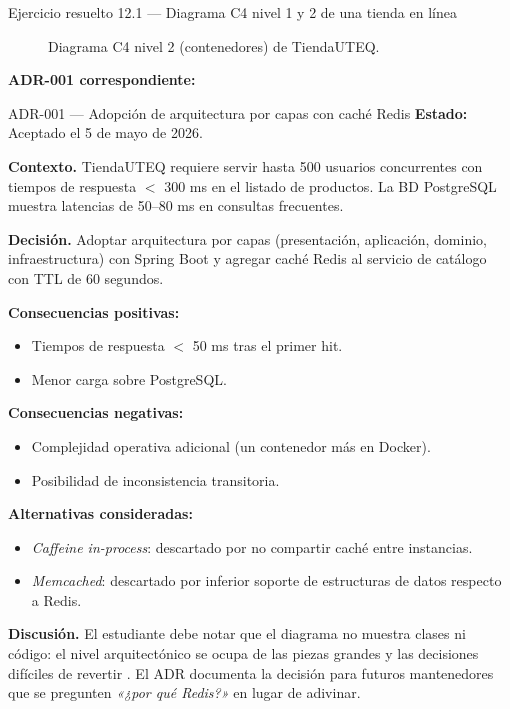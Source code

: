 \begin{cajaejemplo}{Ejercicio resuelto 12.1 --- Diagrama C4 nivel 1 y 2 de una tienda en línea}
\begin{figure}[H]
\caption{Diagrama C4 nivel 2 (contenedores) de TiendaUTEQ.}
\end{figure}

\textbf{ADR-001 correspondiente:}

\begin{cajaadr}{ADR-001 --- Adopción de arquitectura por capas con caché Redis}
\textbf{Estado:} Aceptado el 5 de mayo de 2026.

\textbf{Contexto.} TiendaUTEQ requiere servir hasta 500
usuarios concurrentes con tiempos de respuesta $<$ 300 ms en el
listado de productos. La BD PostgreSQL muestra latencias de 50--80 ms
en consultas frecuentes.

\textbf{Decisión.} Adoptar arquitectura por capas (presentación,
aplicación, dominio, infraestructura) con Spring Boot y agregar caché
Redis al servicio de catálogo con TTL de 60 segundos.

\textbf{Consecuencias positivas:}
\begin{itemize}
\item Tiempos de respuesta $<$ 50 ms tras el primer hit.
\item Menor carga sobre PostgreSQL.
\end{itemize}

\textbf{Consecuencias negativas:}
\begin{itemize}
\item Complejidad operativa adicional (un contenedor más en Docker).
\item Posibilidad de inconsistencia transitoria.
\end{itemize}

\textbf{Alternativas consideradas:}
\begin{itemize}
\item \emph{Caffeine in-process}: descartado por no compartir caché
entre instancias.
\item \emph{Memcached}: descartado por inferior soporte de
estructuras de datos respecto a Redis.
\end{itemize}
\end{cajaadr}

\textbf{Discusión.} El estudiante debe notar que el diagrama no
muestra clases ni código: el nivel arquitectónico se ocupa de las
piezas grandes y las decisiones difíciles de revertir
\cite{bass2021software}. El ADR documenta la decisión para futuros
mantenedores que se pregunten \emph{«¿por qué Redis?»} en lugar de
adivinar.
\end{cajaejemplo}

